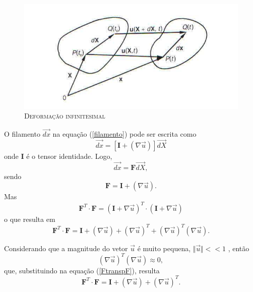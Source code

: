 \begin{figure}[H]
	\centering
	\includegraphics[scale=1]{figuras/campo_de_deformacao.jpg}
	\caption{\textsc{Deformação infinitesimal}}
	\vspace{-0.1cm}
	\label{fig:campodeform}
\end{figure}



O filamento $ \vec{dx} $ na equação (\ref{filamento}) pode ser escrita como 
\begin{equation}
	\vec{dx} = [ \textbf{I} + ( { \nabla} \vec{u})] \vec{dX} 
\end{equation}
onde \textbf{I} é o  tensor identidade. Logo, 
\begin{equation} \label{filamento_dx}
	\vec{dx} = \textbf{F} \vec{dX},
\end{equation}
sendo
\begin{equation} \label{tensordeform}
	\textbf{F} = \textbf{I} + ( { \nabla}  \vec{u}).
\end{equation}
Mas
\begin{equation}
	\textbf{F} ^T \cdot \textbf{F} = ( \textbf{I} + { \nabla}  \vec{u}) ^T \cdot ( \textbf{I} + { \nabla}  \vec{u}) 
\end{equation}
o que resulta em
\begin{equation} \label{FtranspF}
	\textbf{F} ^T \cdot \textbf{F} = \textbf{I} + ( { \nabla}  \vec{u}) + ( { \nabla}  \vec{u}) ^T +  ( { \nabla}  \vec{u}) ^T ( { \nabla}  \vec{u}).
\end{equation}

Considerando que a magnitude do vetor $  \vec{u} $ é muito pequena, $  \Vert \vec{u} \Vert < < 1  $ , então       
\begin{equation}
	( { \nabla}  \vec{u}) ^T ( { \nabla}  \vec{u}) \approx 0,
\end{equation}
que, substituindo na equação (\ref{FtranspF}), resulta
\begin{equation}
	\textbf{F} ^T \cdot \textbf{F} = \textbf{I} + ( { \nabla}  \vec{u}) + ( { \nabla}  \vec{u}) ^T .
\end{equation}

